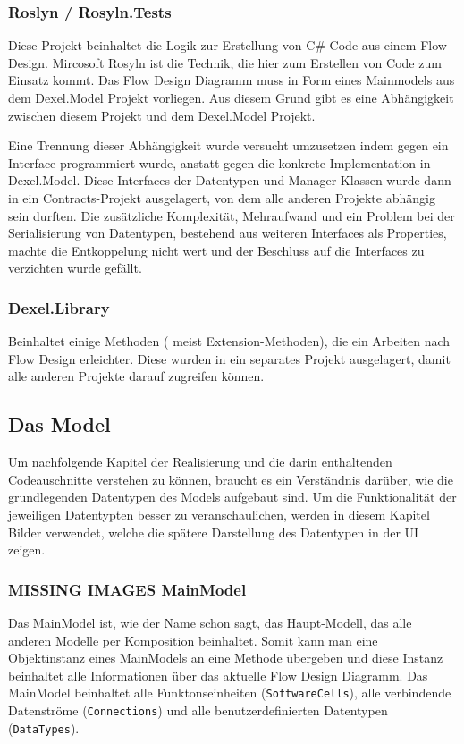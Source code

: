 \documentclass[11pt]{article}
\begin{document}
\subsubsection{Roslyn / Rosyln.Tests}
\label{sec:orgheadline3}
Diese Projekt beinhaltet die Logik zur Erstellung von C\#-Code aus einem Flow
Design. Mircosoft Rosyln ist die Technik, die hier zum Erstellen von Code zum
Einsatz kommt.
Das Flow Design Diagramm muss in Form eines Mainmodels aus dem
Dexel.Model Projekt vorliegen. Aus diesem Grund gibt es eine Abhängigkeit
zwischen diesem Projekt und dem Dexel.Model Projekt. 

Eine Trennung dieser Abhängigkeit wurde versucht umzusetzen indem gegen ein Interface
programmiert wurde, anstatt gegen die konkrete Implementation in
Dexel.Model. Diese Interfaces der Datentypen und Manager-Klassen wurde dann
in ein Contracts-Projekt ausgelagert, von dem alle anderen Projekte abhängig
sein durften. Die zusätzliche Komplexität, Mehraufwand und ein Problem bei
der Serialisierung von Datentypen, bestehend aus weiteren Interfaces als
Properties, machte die Entkoppelung nicht wert und der Beschluss auf die
Interfaces zu verzichten wurde gefällt.

\subsubsection{Dexel.Library}
\label{sec:orgheadline4}
Beinhaltet einige Methoden ( meist Extension-Methoden), die ein Arbeiten
nach Flow Design erleichter. Diese wurden in ein separates Projekt
ausgelagert, damit alle anderen Projekte darauf zugreifen können.

\subsection{Das Model}
\label{sec:orgheadline14}
Um nachfolgende Kapitel der Realisierung und die darin enthaltenden
Codeauschnitte verstehen zu können, braucht es ein Verständnis darüber, wie die
grundlegenden Datentypen des Models aufgebaut sind. Um die Funktionalität der
jeweiligen Datentypten besser zu veranschaulichen, werden in diesem Kapitel
Bilder verwendet, welche die spätere Darstellung des Datentypen in der UI zeigen.

\subsubsection{{\bfseries\sffamily MISSING IMAGES} MainModel}
\label{sec:orgheadline6}
Das MainModel ist, wie der Name schon sagt, das Haupt-Modell, das alle
anderen Modelle per Komposition beinhaltet. Somit kann man eine Objektinstanz
eines MainModels an eine Methode übergeben und diese Instanz beinhaltet alle
Informationen über das aktuelle Flow Design Diagramm. 
Das MainModel beinhaltet alle Funktonseinheiten (\texttt{SoftwareCells}), alle verbindende
Datenströme (\texttt{Connections}) und alle benutzerdefinierten Datentypen (\texttt{DataTypes}).
\end{document}
